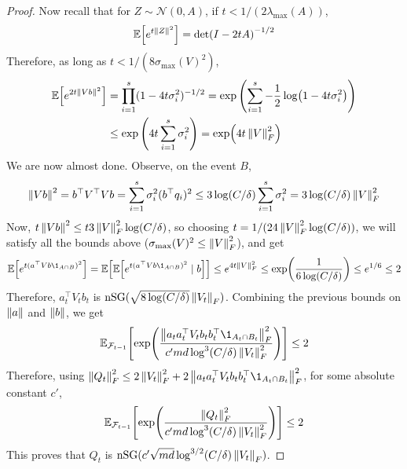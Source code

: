 \begin{proof}
Now recall that for $Z \sim \mathcal N(0, A)$, if $t < 1/(2 \lambda_{\max}(A))$,
\begin{align*}
    \mathbb{E}\qty[e^{t \left\lVert Z \right\rVert^2}] = \det(I-2tA)^{-1/2}
\end{align*}
Therefore, as long as $t < 1/(8\sigma_{\max}(V)^2)$,
\begin{align*}
    \mathbb{E}\qty[e^{2t\left\lVert Vb \right\rVert^2}] &= \prod_{i=1}^s (1-4t \sigma_i^2)^{-1/2} = \exp\left(\sum_{i=1}^s -\frac 12 \log(1-4t\sigma_i^2)\right) \\
    &\leq \exp\left(4t \sum_{i=1}^s \sigma_i^2\right) = \exp(4t\left\lVert V \right\rVert_F^2)
\end{align*}
We are now almost done. Observe, on the event $B$,
\begin{align*}
    \left\lVert Vb \right\rVert^2 = b^\top V^\top V b = \sum_{i=1}^s \sigma_i^2 (b^\top q_i)^2 \leq 3\log(C/\delta) \sum_{i=1}^s \sigma_i^2 = 3\log(C/\delta) \left\lVert V \right\rVert_F^2
\end{align*}
Now, $t\left\lVert Vb \right\rVert^2 \leq t 3\left\lVert V \right\rVert_F^2 \log(C/\delta)$, so choosing $t = 1/(24\left\lVert V \right\rVert_F^2 \log(C/\delta))$, we will satisfy all the bounds above ($\sigma_{\max}(V)^2 \leq \left\lVert V \right\rVert_F^2$), and get
\begin{align*}
    \E[e^{t(a^\top V b \1_{A \cap B})^2}] = \E[\E[e^{t (a^\top Vb \1_{A \cap B})^2} \mid b]] \leq e^{4t \mg{V}_F^2} \leq \exp(\frac 1{6\log(C/\delta)}) \leq e^{1/6} \leq 2
\end{align*}
Therefore, $a_t^\top V_t b_t$ is $\mathrm{nSG}(\sqrt{8 \log(C/\delta)} \left\lVert V_t \right\rVert_F)$. Combining the previous bounds on $\left\lVert a \right\rVert$ and $\left\lVert b \right\rVert$, we get
\begin{align*}
    \Et[\exp(\frac{\mg{a_ta_t^\top V_t b_tb_t^\top \1_{A_t \cap B_t}}_F^2}{c' md \log^3(C/\delta)\mg{V_t}_F^2})] \leq 2
\end{align*}
Therefore, using $\mg{Q_t}_F^2 \leq 2\mg{V_t}_F^2 + 2\mg{a_ta_t^\top V_t b_tb_t^\top \1_{A_t \cap B_t}}_F^2$, for some absolute constant $c'$,
\begin{align*}
    \mathbb{E}_{\mathcal F_{t-1}}\qty[\exp(\frac{\left\lVert Q_t \right\rVert_F^2}{c' md \log^3(C/\delta)\left\lVert V_t \right\rVert_F^2})] \leq 2
\end{align*}
This proves that $Q_t$ is $\mathrm{nSG}(c'\sqrt{md}\log^{3/2}(C/\delta) \left\lVert V_t \right\rVert_F)$. 


\end{proof}
